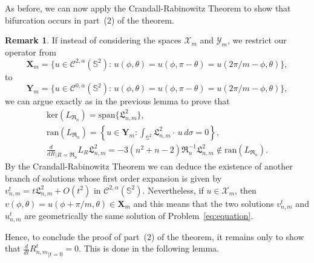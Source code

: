 \documentclass[10pt,reqno,english]{amsart}
\newcommand{\Sd}{\mathbb{S}^2}
\newcommand{\rn}{{\mathfrak R}_n  }
\theoremstyle{definition}
\newtheorem{remark}[lemma]{Remark}
\numberwithin{equation}{section}
\begin{document}
As before, we can now apply the Crandall-Rabinowitz Theorem to show that bifurcation occurs in part~(2) of the theorem.

\begin{remark}
\label{rmk-bif3}
If instead of considering the spaces $\mathcal X_m$ and $\mathcal Y_m$, we restrict our operator from
\[
\mathbf X_m=\{u\in\mathcal C^{2,\alpha}(\Sd):\,u(\phi,\theta)=u(\phi,\pi-\theta)=u(2\pi/m-\phi,\theta)\},
\]
to
\[
\mathbf Y_m=\{u\in\mathcal C^{0,\alpha}(\Sd):\,u(\phi,\theta)=u(\phi,\pi-\theta)=u(2\pi/m-\phi,\theta)\},
\]
we can argue exactly as in the previous lemma to prove that
\begin{gather*}
\mathrm{ker}( L_{\rn})=\mathrm{span}\{\mathfrak L^2_{n,m}\},\\
\mathrm{ran}(L_{\rn})=\left\{u\in\mathbf Y_m:\int_{\Sd}\mathfrak L^2_{n,m}\cdot\,u\,d\sigma=0\right\},\\
\frac{d}{dR}_{|R=\rn}L_R\mathfrak L^2_{n,m}=-3(n^2+n-2)\rn^{-1}\mathfrak L^2_{n,m}\not\in\mathrm{ran}(L_{\rn}).
\end{gather*}
By the Crandall-Rabinowitz Theorem we can deduce the existence of another branch of solutions whose first order expansion is given by $v_{n,m}^t=t \mathfrak L^2_{n,m} +O(t^2)$ in $\mathcal C^{2,\alpha}(\Sd)$. Nevertheless, if $u\in\mathcal X_m$, then $v (\phi, \theta) = u (\phi+\pi/m, \theta)\in\mathbf X_m$ and this means that the two solutions $v_{n,m}^t$ and $u_{n,m}^t$
 are geometrically the same solution of Problem~\eqref{eq:equation}.
\end{remark}

Hence, to conclude the proof of part~(2) of the theorem, it remains only to show that $\frac{d}{dt}{R_{n,m}^t}_{|t=0}=0$. This is done in the following lemma.
\end{document}
